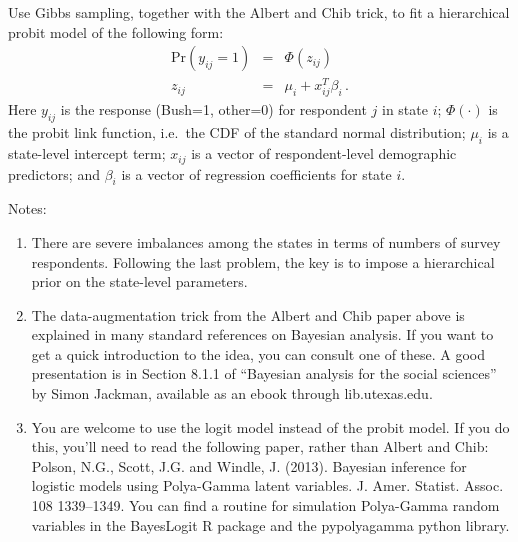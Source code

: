 \documentclass[11pt]{article}
\begin{document}
Use Gibbs sampling, together with the Albert and Chib trick, to fit a hierarchical probit model of the following form:
\begin{eqnarray*}
\mbox{Pr}(y_{ij} = 1) &=& \Phi(z_{ij})  \\
z_{ij} &=& \mu_i + x_{ij}^T \beta_i \, .
\end{eqnarray*}
Here $y_{ij}$ is the response (Bush=1, other=0) for respondent $j$ in state $i$; $\Phi(\cdot)$ is the probit link function, i.e.~the CDF of the standard normal distribution; $\mu_i$ is a state-level intercept term; $x_{ij}$ is a vector of respondent-level demographic predictors; and $\beta_i$ is a vector of regression coefficients for state $i$.

Notes:
\begin{enumerate}
\item There are severe imbalances among the states in terms of numbers of survey respondents. Following the last problem, the key is to impose a hierarchical prior on the state-level parameters.
\item The data-augmentation trick from the Albert and Chib paper above is explained in many standard references on Bayesian analysis.  If you want to get a quick introduction to the idea, you can consult one of these.  A good presentation is in Section 8.1.1 of ``Bayesian analysis for the social sciences'' by Simon Jackman, available as an ebook through lib.utexas.edu.
\item You are welcome to use the logit model instead of the probit model.  If you do this, you'll need to read the following paper, rather than Albert and Chib: Polson, N.G., Scott, J.G. and Windle, J. (2013). Bayesian inference for logistic models using Polya-Gamma latent variables. J. Amer. Statist. Assoc. 108 1339--1349.    You can find a routine for simulation Polya-Gamma random variables in the BayesLogit R package and the pypolyagamma python library.  
\end{enumerate}
\end{document}
